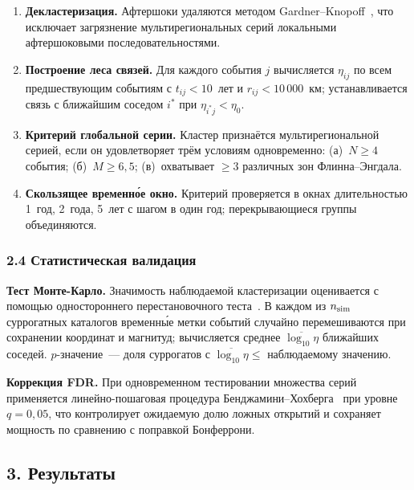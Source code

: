 \documentclass[12pt,a4paper]{article}
\begin{document}
\begin{enumerate}[leftmargin=*,label=\textbf{\arabic*.}]

\item \textbf{Декластеризация.} Афтершоки удаляются методом
Gardner--Knopoff~\cite{Gardner1974}, что исключает загрязнение
мультирегиональных серий локальными афтершоковыми последовательностями.

\item \textbf{Построение леса связей.} Для каждого события $j$ вычисляется
$\eta_{ij}$ по всем предшествующим событиям с $t_{ij}<10$~лет и
$r_{ij}<10\,000$~км; устанавливается связь с ближайшим соседом $i^*$ при
$\eta_{i^*j}<\eta_0$.

\item \textbf{Критерий глобальной серии.} Кластер признаётся
мультирегиональной серией, если он удовлетворяет трём условиям одновременно:
(а)~$N\geq4$ события; (б)~$M\geq6{,}5$; (в)~охватывает $\geq3$ различных
зон Флинна--Энгдала.

\item \textbf{Скользящее временн\'{о}е окно.} Критерий проверяется в окнах
длительностью 1~год, 2~года, 5~лет с шагом в один год; перекрывающиеся
группы объединяются.

\end{enumerate}

\subsubsection*{2.4 Статистическая валидация}

\textbf{Тест Монте-Карло.} Значимость наблюдаемой кластеризации оценивается
с помощью одностороннего перестановочного теста~\cite{Michael2011}. В каждом
из $n_{\rm sim}$ суррогатных каталогов временн\'{ы}е метки событий случайно
перемешиваются при сохранении координат и магнитуд; вычисляется среднее
$\overline{\log_{10}\eta}$ ближайших соседей. $p$-значение~--- доля суррогатов
с $\overline{\log_{10}\eta}\leq$ наблюдаемому значению.

\textbf{Коррекция FDR.} При одновременном тестировании множества серий
применяется линейно-пошаговая процедура Бенджамини--Хохберга~\cite{BenjaminiHochberg1995}
при уровне $q=0{,}05$, что контролирует ожидаемую долю ложных открытий
и сохраняет мощность по сравнению с поправкой Бонферрони.

\vspace{0.3cm}

\subsection*{3. Результаты}
\end{document}
